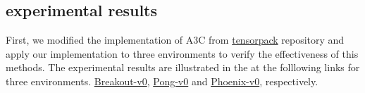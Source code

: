 \subsection{experimental results}


First, we modified the implementation of A3C from \href{https://github.com/ppwwyyxx/tensorpack}{tensorpack} repository and
apply our implementation to three environments to verify the effectiveness of this methods.
The experimental results are illustrated in the at the folllowing links for three environments.
\href{https://gym.openai.com/evaluations/eval_i9E40nAQuOTiSa0bxYBA#reproducibility}{Breakout-v0}, 
\href{https://gym.openai.com/evaluations/eval_mvXuxP13SSacO01UIhsg#reproducibility}{Pong-v0} and 
\href{https://gym.openai.com/evaluations/eval_Gva8XrEvTQi63KOd5Gyq1Q#reproducibility}{Phoenix-v0}, respectively.




